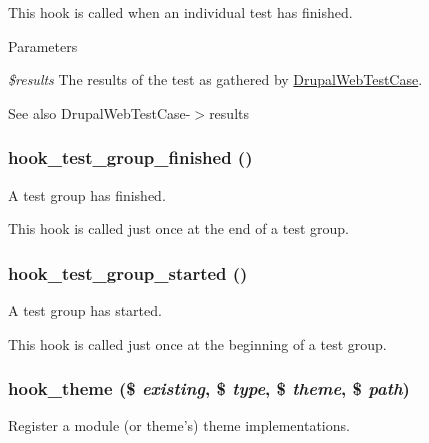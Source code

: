 This hook is called when an individual test has finished.


\begin{DoxyParams}{Parameters}
\item[{\em \$results}]The results of the test as gathered by \hyperlink{classDrupalWebTestCase}{DrupalWebTestCase}.\end{DoxyParams}
\begin{DoxySeeAlso}{See also}
DrupalWebTestCase-\/$>$results 
\end{DoxySeeAlso}
\hypertarget{group__hooks_ga9470b40a0a03f248e7cd9a44930c155e}{
\subsubsection[{hook\_\-test\_\-group\_\-finished}]{\setlength{\rightskip}{0pt plus 5cm}hook\_\-test\_\-group\_\-finished ()}}
\label{group__hooks_ga9470b40a0a03f248e7cd9a44930c155e}
A test group has finished.

This hook is called just once at the end of a test group. \hypertarget{group__hooks_gaf2cec6422b14cc1d0cace3ee2b26de6d}{
\subsubsection[{hook\_\-test\_\-group\_\-started}]{\setlength{\rightskip}{0pt plus 5cm}hook\_\-test\_\-group\_\-started ()}}
\label{group__hooks_gaf2cec6422b14cc1d0cace3ee2b26de6d}
A test group has started.

This hook is called just once at the beginning of a test group. \hypertarget{group__hooks_ga013ccb45c7aaab1c16cf9691428c910d}{
\subsubsection[{hook\_\-theme}]{\setlength{\rightskip}{0pt plus 5cm}hook\_\-theme (\$ {\em existing}, \/  \$ {\em type}, \/  \$ {\em theme}, \/  \$ {\em path})}}
\label{group__hooks_ga013ccb45c7aaab1c16cf9691428c910d}
Register a module (or theme's) theme implementations.

